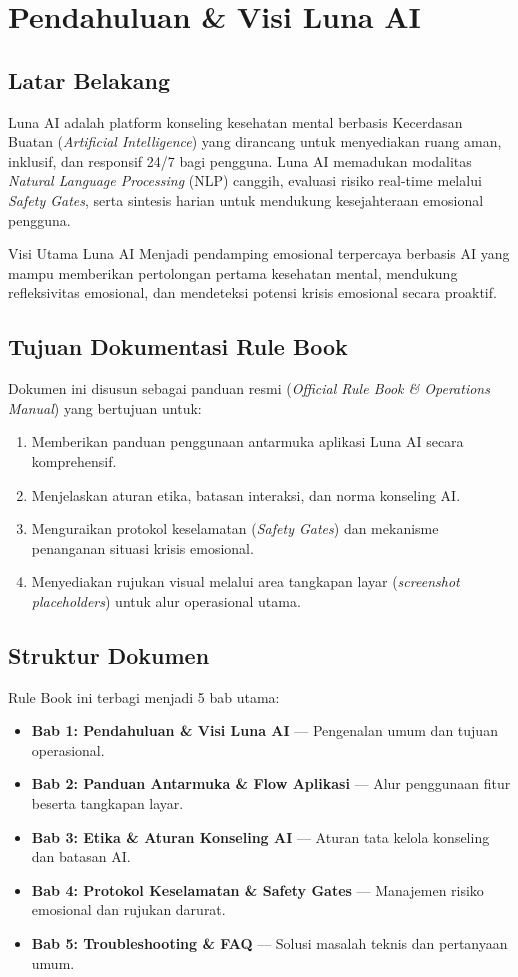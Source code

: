 \chapter{Pendahuluan \& Visi Luna AI}

\section{Latar Belakang}
Luna AI adalah platform konseling kesehatan mental berbasis Kecerdasan Buatan (\textit{Artificial Intelligence}) yang dirancang untuk menyediakan ruang aman, inklusif, dan responsif 24/7 bagi pengguna. Luna AI memadukan modalitas \textit{Natural Language Processing} (NLP) canggih, evaluasi risiko real-time melalui \textit{Safety Gates}, serta sintesis harian untuk mendukung kesejahteraan emosional pengguna.

\begin{lunacallout}{Visi Utama Luna AI}
Menjadi pendamping emosional terpercaya berbasis AI yang mampu memberikan pertolongan pertama kesehatan mental, mendukung refleksivitas emosional, dan mendeteksi potensi krisis emosional secara proaktif.
\end{lunacallout}

\section{Tujuan Dokumentasi Rule Book}
Dokumen ini disusun sebagai panduan resmi (\textit{Official Rule Book \& Operations Manual}) yang bertujuan untuk:
\begin{enumerate}[label=\alph*.]
    \item Memberikan panduan penggunaan antarmuka aplikasi Luna AI secara komprehensif.
    \item Menjelaskan aturan etika, batasan interaksi, dan norma konseling AI.
    \item Menguraikan protokol keselamatan (\textit{Safety Gates}) dan mekanisme penanganan situasi krisis emosional.
    \item Menyediakan rujukan visual melalui area tangkapan layar (\textit{screenshot placeholders}) untuk alur operasional utama.
\end{enumerate}

\section{Struktur Dokumen}
Rule Book ini terbagi menjadi 5 bab utama:
\begin{itemize}
    \item \textbf{Bab 1: Pendahuluan \& Visi Luna AI} — Pengenalan umum dan tujuan operasional.
    \item \textbf{Bab 2: Panduan Antarmuka \& Flow Aplikasi} — Alur penggunaan fitur beserta tangkapan layar.
    \item \textbf{Bab 3: Etika \& Aturan Konseling AI} — Aturan tata kelola konseling dan batasan AI.
    \item \textbf{Bab 4: Protokol Keselamatan \& Safety Gates} — Manajemen risiko emosional dan rujukan darurat.
    \item \textbf{Bab 5: Troubleshooting \& FAQ} — Solusi masalah teknis dan pertanyaan umum.
\end{itemize}
